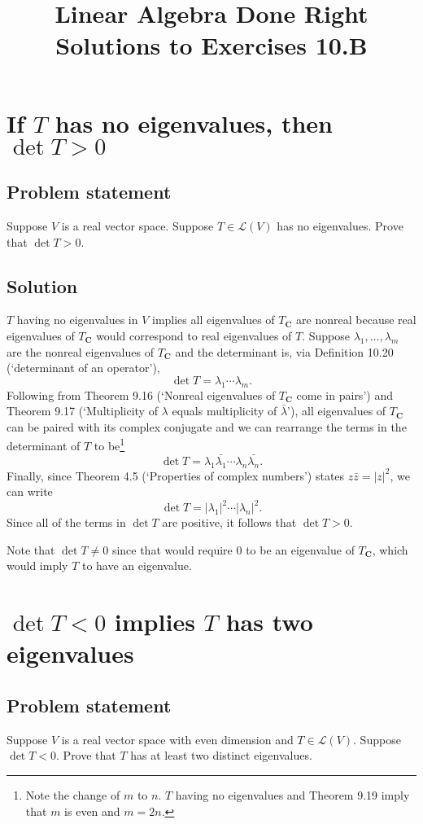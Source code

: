 \documentclass{article}
\title{Linear Algebra Done Right\\Solutions to Exercises 10.B}
\author{}
\date{}
\begin{document}
\maketitle

\section{If $T$ has no eigenvalues, then $\det T>0$}
\subsection*{Problem statement}
Suppose $V$ is a real vector space. 
Suppose $T\in\mathcal{L}(V)$ has no eigenvalues. 
Prove that $\det T>0$.

\subsection*{Solution}
$T$ having no eigenvalues in $V$ implies all eigenvalues of $T_{\mathbf{C}}$ are nonreal because real eigenvalues of $T_{\mathbf{C}}$ would correspond to real eigenvalues of $T$. 
Suppose $\lambda_1,\ldots,\lambda_m$ are the nonreal eigenvalues of $T_{\mathbf{C}}$ and the determinant is, via Definition 10.20 (`determinant of an operator'), 
\[\det T=\lambda_1\cdots\lambda_m.\] 
Following from Theorem 9.16 (`Nonreal eigenvalues of $T_{\mathbf{C}}$ come in pairs') and Theorem 9.17 (`Multiplicity of $\lambda$ equals multiplicity of $\bar{\lambda}$'), all eigenvalues of $T_{\mathbf{C}}$ can be paired with its complex conjugate and we can rearrange the terms in the determinant of $T$ to be\footnote{
Note the change of $m$ to $n$. 
$T$ having no eigenvalues and Theorem 9.19 imply that $m$ is even and $m=2n$.}
\[\det T=\lambda_1\bar{\lambda_1}\cdots\lambda_n\bar{\lambda_n}.\]
Finally, since Theorem 4.5 (`Properties of complex numbers') states $z\bar{z}=|z|^2$, we can write
\[\det T=|\lambda_1|^2\cdots|\lambda_n|^2.\]
Since all of the terms in $\det T$ are positive, it follows that $\det T>0$.

Note that $\det T\neq0$ since that would require $0$ to be an eigenvalue of $T_{\mathbf{C}}$, which would imply $T$ to have an eigenvalue.

\clearpage

\section{$\det T<0$ implies $T$ has two eigenvalues}
\subsection*{Problem statement}
Suppose $V$ is a real vector space with even dimension and $T\in\mathcal{L}(V)$. 
Suppose $\det T<0$. 
Prove that $T$ has at least two distinct eigenvalues.
\end{document}
